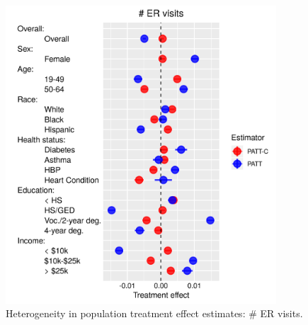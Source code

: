 \documentclass[hidelinks,12pt]{article}
\begin{document}
\begin{appendices}
\begin{figure}[htbp]
	\begin{center}
		\includegraphics[width = 0.9\textwidth]{num-visit-plot.png}
		\caption{Heterogeneity in population treatment effect estimates: $\#$ ER visits.\label{fig:num-visit-plot}}
	\end{center}
\end{figure}


\end{appendices}
\end{document}
